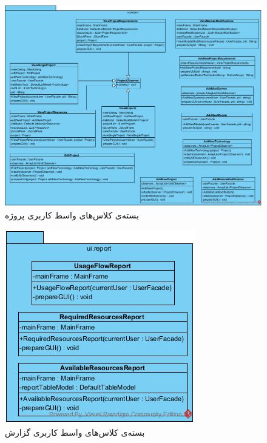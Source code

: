 \begin{figure}[H]
	\centering
	\includegraphics[width=\textwidth]{img/class-design/ui/UIProject}
	
	\caption{بسته‌ی کلاس‌های واسط کاربری پروژه}
\end{figure}

\begin{figure}[H]
	\centering
	\includegraphics[width=\textwidth]{img/class-design/ui/UIReport}
	
	\caption{بسته‌ی کلاس‌های واسط کاربری گزارش}
\end{figure}

